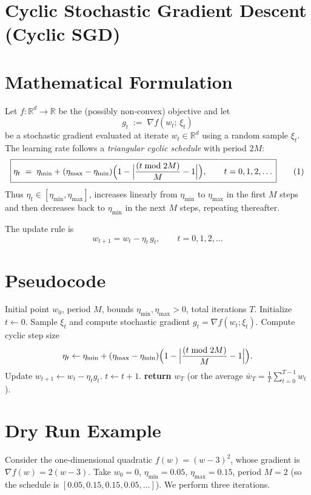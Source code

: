 \documentclass[11pt]{article}
\newcommand{\RR}{\mathbb{R}}
\begin{document}
\section*{Cyclic Stochastic Gradient Descent (Cyclic SGD)}

\section*{Mathematical Formulation}
Let $f:\RR^{d}\rightarrow\RR$ be the (possibly non‑convex) objective and let 
\[
g_t \;:=\; \nabla f(w_t;\,\xi_t)
\]
be a stochastic gradient evaluated at iterate $w_t\in\RR^{d}$ using a random sample
$\xi_t$.  
The learning rate follows a \emph{triangular cyclic schedule} with period $2M$:
\[
\boxed{
\eta_t \;=\; \eta_{\min}
        + (\eta_{\max}-\eta_{\min})
          \Bigl(1-\Bigl|\frac{(t \bmod 2M)}{M}-1\Bigr|\Bigr),\qquad t=0,1,2,\dots
}
\tag{1}
\]
Thus $\eta_t\in[\eta_{\min},\eta_{\max}]$, increases linearly from $\eta_{\min}$ to 
$\eta_{\max}$ in the first $M$ steps and then decreases back to $\eta_{\min}$ in the next $M$ steps, repeating thereafter.

The update rule is
\[
\boxed{
w_{t+1}=w_t-\eta_t\,g_t ,\qquad t=0,1,2,\dots
}
\tag{2}
\]

\section*{Pseudocode}
\begin{algorithm}[H]
\caption{Cyclic Stochastic Gradient Descent}
\begin{algorithmic}[1]
\Require Initial point $w_0$, period $M$, bounds $\eta_{\min},\eta_{\max}>0$, 
      total iterations $T$.
\State Initialize $t\gets0$.
    \State Sample $\xi_t$ and compute stochastic gradient $g_t=\nabla f(w_t;\xi_t)$.
    \State Compute cyclic step size
    \[
    \eta_t\gets\eta_{\min}+(\eta_{\max}-\eta_{\min})
               \Bigl(1-\Bigl|\frac{(t\bmod 2M)}{M}-1\Bigr|\Bigr).
    \]
    \State Update $w_{t+1}\gets w_t-\eta_t g_t$.
    \State $t\gets t+1$.
\EndWhile
\State \textbf{return} $w_T$ (or the average $\bar w_T=\frac1T\sum_{t=0}^{T-1}w_t$).
\end{algorithmic}
\end{algorithm}

\section*{Dry Run Example}
Consider the one‑dimensional quadratic $f(w)=(w-3)^2$, whose gradient is
$\nabla f(w)=2(w-3)$.  
Take $w_0=0$, $\eta_{\min}=0.05$, $\eta_{\max}=0.15$, period $M=2$ (so the schedule
is $[0.05,0.15,0.15,0.05,\dots]$).  We perform three iterations.
\end{document}
